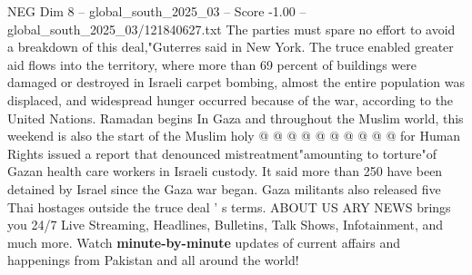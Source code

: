 \begin{textsample}{NEG Dim 8 – global\_south\_2025\_03 – Score -1.00 – global\_south\_2025\_03/121840627.txt}
The parties must spare no effort to avoid a breakdown of this deal,"Guterres said in New York.
The truce enabled greater aid flows into the territory, where more than 69 percent of buildings were damaged or destroyed in Israeli carpet bombing, almost the entire population was displaced, and widespread hunger occurred because of the war, according to the United Nations.
Ramadan begins In Gaza and throughout the Muslim world, this weekend is also the start of the Muslim holy @ @ @ @ @ @ @ @ @ @ for Human Rights issued a report that denounced mistreatment"amounting to torture"of Gazan health care workers in Israeli custody.
It said more than 250 have been detained by Israel since the Gaza war began.
Gaza militants also released five Thai hostages outside the truce deal ' s terms.
ABOUT US ARY NEWS brings you 24/7 Live Streaming, Headlines, Bulletins, Talk Shows, Infotainment, and much more.
Watch \textbf{minute-by-minute} updates of current affairs and happenings from Pakistan and all around the world!

\end{textsample}
